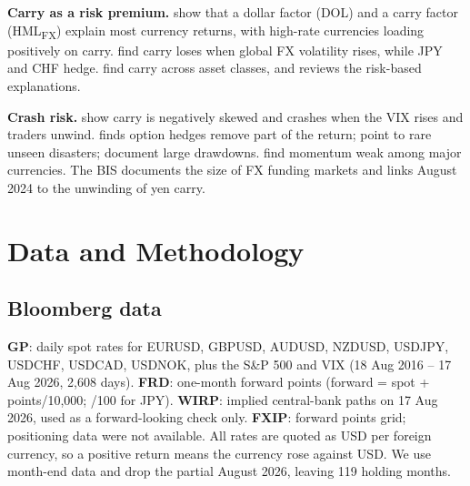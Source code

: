 \documentclass[11pt,a4paper]{article}
\begin{document}
\textbf{Carry as a risk premium.} \citet{lrv2011} show that a dollar factor (DOL) and a carry factor (HML\textsubscript{FX})
explain most currency returns, with high-rate currencies loading positively on carry. \citet{msss2012a} find carry loses
when global FX volatility rises, while JPY and CHF hedge. \citet{koijen2018} find carry across asset classes, and
\citet{burnside2012} reviews the risk-based explanations.

\textbf{Crash risk.} \citet{bnp2009} show carry is negatively skewed and crashes when the VIX rises and traders unwind.
\citet{jurek2014} finds option hedges remove part of the return; \citet{burnside2011} point to rare unseen disasters;
\citet{dhl2017} document large drawdowns. \citet{msss2012b} find momentum weak among major currencies. The BIS
\citep{bis2025,bis2024} documents the size of FX funding markets and links August 2024 to the unwinding of yen carry.

\section{Data and Methodology}
\subsection{Bloomberg data}
\textbf{GP}: daily spot rates for EURUSD, GBPUSD, AUDUSD, NZDUSD, USDJPY, USDCHF, USDCAD, USDNOK, plus the S\&P 500 and VIX
(18 Aug 2016 -- 17 Aug 2026, 2,608 days). \textbf{FRD}: one-month forward points (forward = spot + points/10,000; /100 for
JPY). \textbf{WIRP}: implied central-bank paths on 17 Aug 2026, used as a forward-looking check only. \textbf{FXIP}: forward
points grid; positioning data were not available. All rates are quoted as USD per foreign currency, so a positive return
means the currency rose against USD. We use month-end data and drop the partial August 2026, leaving 119 holding months.
\end{document}
